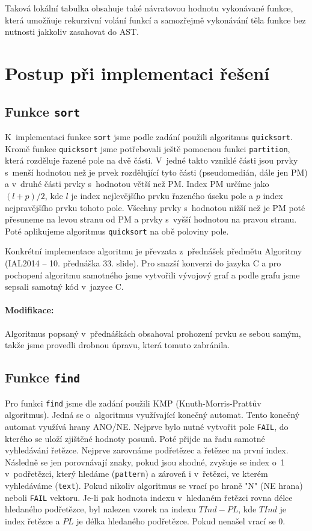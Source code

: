 \documentclass[12pt,a4paper,titlepage,final]{article}
\begin{document}
Taková lokální tabulka obsahuje také návratovou hodnotu vykonávané funkce, která umožňuje rekurzivní volání funkcí a samozřejmě vykonávání těla
funkce bez nutnosti jakkoliv zasahovat do AST.


\section{Postup při implementaci řešení} \label{postup_pri_implementaci_reseni}
\subsection{Funkce \texttt{sort}}
K~implementaci funkce \verb|sort| jsme podle zadání použili algoritmus \verb|quicksort|.
Kromě funkce \verb|quicksort| jsme potřebovali ještě pomocnou funkci \verb|partition|,
která rozděluje řazené pole na dvě části. V~jedné takto vzniklé části jsou prvky
s~menší hodnotou než je prvek rozdělující tyto části (pseudomedián, dále jen PM)
a v~druhé části prvky s~hodnotou větší než PM. Index PM určíme jako $(l+p)/2$, kde
$l$ je index nejlevějšího prvku řazeného úseku pole a $p$ index nejpravějšího prvku
tohoto pole. Všechny prvky s~hodnotou nižší než je PM poté přesuneme na levou
stranu od PM a prvky s~vyšší hodnotou na pravou stranu. Poté aplikujeme algoritmus
\verb|quicksort| na obě poloviny pole.

Konkrétní implementace algoritmu je převzata z~přednášek předmětu Algoritmy
(IAL2014 \cite{honzik2} -- 10. přednáška 33. slide). Pro snazší konverzi do jazyka
C a pro pochopení algoritmu samotného jsme vytvořili vývojový graf a podle grafu
jsme sepsali samotný kód v~jazyce C.

\paragraph{Modifikace:} Algoritmus popsaný v~přednáškách obsahoval prohození
prvku se sebou samým, takže jsme provedli drobnou úpravu, která tomuto zabránila.

\subsection{Funkce \texttt{find}}
Pro funkci \verb|find| jsme dle zadání použili KMP (Knuth-Morris-Prattův algoritmus).
Jedná se o~algoritmus využívající konečný automat. Tento konečný automat využívá
hrany ANO/NE. Nejprve bylo nutné vytvořit pole \verb|FAIL|, do kterého se
uloží zjištěné hodnoty posunů. Poté přijde na řadu samotné vyhledávání řetězce.
Nejprve zarovnáme podřetězec a řetězec na první index. Následně se jen porovnávají znaky,
pokud jsou shodné, zvyšuje se index o~1 v~podřetězci, který hledáme (\verb|pattern|)
a zároveň i v~řetězci, ve kterém vyhledáváme (\verb|text|). Pokud nikoliv algoritmus se
vrací po hraně "N" (NE hrana) neboli \verb|FAIL| vektoru. Je-li pak hodnota indexu
v~hledaném řetězci rovna délce hledaného podřetězce, byl nalezen vzorek na
indexu $TInd - PL$, kde $TInd$ je index řetězce a $PL$ je délka hledaného podřetězce.
Pokud nenašel vrací se 0.
\end{document}
